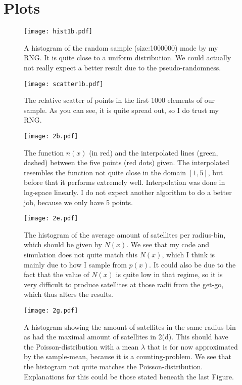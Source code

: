 \documentclass[10pt]{article}
\renewcommand{\l}{\lambda}
\begin{document}
\section{Plots}



\begin{figure}[H]
  \centering
  \texttt{[image: hist1b.pdf]}
  \caption{A histogram of the random sample (size:1000000) made by my RNG. It is quite close to a uniform distribution. We could actually not really expect a better result due to the pseudo-randomness.}
  \label{fig:fig1}
\end{figure}

\begin{figure}[H]
  \centering
  \texttt{[image: scatter1b.pdf]}
  \caption{The relative scatter of points in the first 1000 elements of our sample. As you can see, it is quite spread out, so I do trust my RNG.}
  \label{fig:fig2}
\end{figure}

\begin{figure}[H]
  \centering
  \texttt{[image: 2b.pdf]}
  \caption{The function $n(x)$ (in red) and the interpolated lines (green, dashed) between the five points (red dots) given. The interpolated resembles the function not quite close in the domain $[1,5]$, but before that it performs extremely well. Interpolation was done in log-space linearly. I do not expect another algorithm to do a better job, because we only have 5 points.}
  \label{fig:fig3}
\end{figure}

\begin{figure}[H]
  \centering
  \texttt{[image: 2e.pdf]}
  \caption{The histogram of the average amount of satellites per radius-bin, which should be given by $N(x)$. We see that my code and simulation does not quite match this $N(x)$, which I think is mainly due to how I sample from $p(x)$. It could also be due to the fact that the value of $N(x)$ is quite low in that regime, so it is very difficult to produce satellites at those radii from the get-go, which thus alters the results.}
  \label{fig:fig4}
\end{figure}

\begin{figure}[H]
  \centering
  \texttt{[image: 2g.pdf]}
  \caption{A histogram showing the amount of satellites in the same radius-bin as had the maximal amount of satellites in 2(d). This should have the Poisson-distribution with a mean $\l$ that is for now approximated by the sample-mean, because it is a counting-problem. We see that the histogram not quite matches the Poisson-distribution. Explanations for this could be those stated beneath the last Figure.}
  \label{fig:fig5}
\end{figure}
\end{document}
